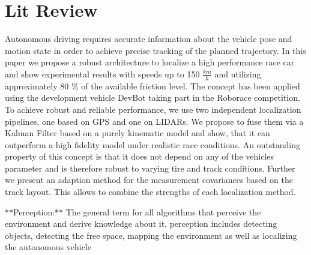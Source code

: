 \chapter{Lit Review}



Autonomous driving requires accurate information about the vehicle pose and motion state in order to achieve precise tracking of the planned trajectory. In this paper we propose a robust architecture to localize a high performance race car and show experimental results with speeds up to 150 $\frac{km}{h}$ and utilizing approximately 80 $\%$ of the available friction level. The concept has been applied using the development vehicle DevBot taking part in the Roborace competition. To achieve robust and reliable performance, we use two independent localization pipelines, one based on GPS and one on LIDARs. We propose to fuse them via a Kalman Filter based on a purely kinematic model and show, that it can outperform a high fidelity model under realistic race conditions. An outstanding property of this concept is that it does not depend on any of the vehicles parameter and is therefore robust to varying tire and track conditions. Further we present an adaption method for the measurement covariances based on the track layout. This allows to combine the strengths of each localization method.\cite{Alex19}


**Perception:** 
The general term for all algorithms that perceive the environment and derive knowledge about it. perception includes detecting objects, detecting the free space, mapping the environment as well as localizing the autonomous vehicle

